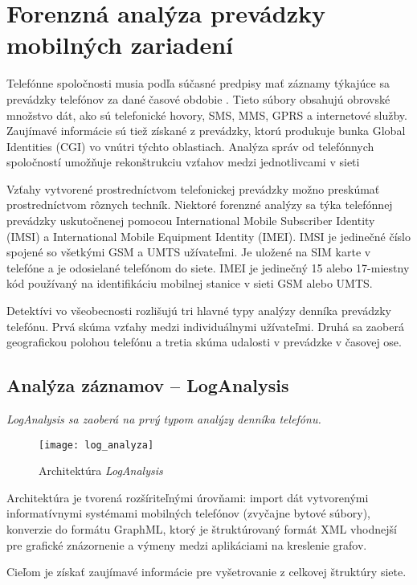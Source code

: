 \chapter{Forenzná analýza prevádzky mobilných zariadení}

Telefónne spoločnosti musia podľa súčasné predpisy mať záznamy týkajúce sa prevádzky telefónov za dané časové obdobie \cite{Catanese:2010:VTF:1877972.1877992}. Tieto súbory obsahujú obrovské množstvo dát, ako sú telefonické hovory, SMS, MMS, GPRS a internetové služby. Zaujímavé informácie sú tiež získané z prevádzky, ktorú produkuje bunka Global Identities (CGI) vo vnútri týchto oblastiach. Analýza správ od telefónnych spoločností umožňuje rekonštrukciu vzťahov medzi jednotlivcami v sieti

Vzťahy vytvorené prostredníctvom telefonickej prevádzky možno preskúmať prostredníctvom rôznych techník. Niektoré forenzné analýzy sa týka telefónnej prevádzky uskutočnenej pomocou International Mobile Subscriber Identity (IMSI) a International Mobile Equipment Identity (IMEI). IMSI je jedinečné číslo spojené so všetkými GSM a UMTS užívateľmi. Je uložené na SIM karte
v telefóne a je odosielané telefónom do siete. IMEI je jedinečný 15 alebo 17-miestny kód používaný na identifikáciu mobilnej stanice v sieti GSM alebo UMTS. 

Detektívi vo všeobecnosti rozlišujú tri hlavné typy analýzy denníka prevádzky telefónu. Prvá skúma vzťahy medzi individuálnymi užívateľmi. Druhá sa zaoberá geografickou polohou telefónu a tretia skúma udalosti v prevádzke v časovej ose.

\newpage

\section{Analýza záznamov -- LogAnalysis}
\it{LogAnalysis} sa zaoberá na prvý typom analýzy denníka telefónu.

\begin{figure}[h]
	\texttt{[image: log\_analyza]}
	\caption{Architektúra \it{LogAnalysis}}
\end{figure}

Architektúra je tvorená rozšíriteľnými úrovňami: import dát vytvorenými informatívnymi
systémami mobilných telefónov (zvyčajne bytové súbory), konverzie do formátu GraphML, ktorý je štruktúrovaný formát XML vhodnejší pre grafické znázornenie a výmeny medzi aplikáciami na kreslenie grafov.

Cieľom je získať zaujímavé informácie pre vyšetrovanie z celkovej štruktúry siete.
